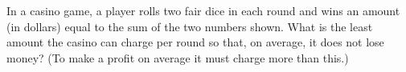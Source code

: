 In a casino game, a player rolls two fair dice in each round and wins an amount (in dollars) equal to the sum of the two numbers shown. What is the least amount the casino can charge per round so that, on average, it does not lose money? (To make a profit on average it must charge more than this.)
